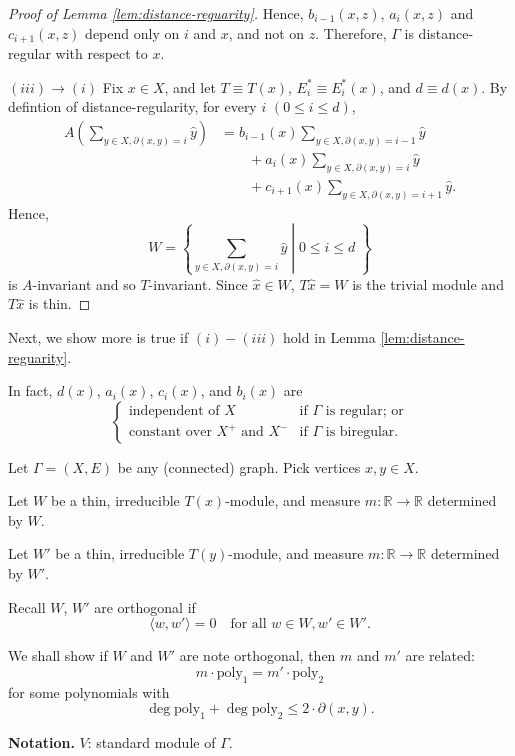\documentclass[
]{book}
\theoremstyle{definition}
\theoremstyle{definition}
\theoremstyle{definition}
\theoremstyle{definition}
\theoremstyle{remark}
\begin{document}
\begin{proof}[Proof of Lemma \ref{lem:distance-reguarity}]
Hence, \(b_{i-1}(x,z)\), \(a_i(x,z)\) and \(c_{i+1}(x,z)\) depend only on \(i\) and \(x\), and not on \(z\).
Therefore, \(\Gamma\) is distance-regular with respect to \(x\).

\((iii)\to (i)\)
Fix \(x\in X\), and let \(T \equiv T(x)\), \(E^*_i\equiv E^*_i(x)\), and \(d \equiv d(x)\).
By defintion of distance-regularity, for every \(i\) \((0\leq i\leq d)\),
\begin{align}
A\left(\sum_{y\in X, \partial(x,y)=i}\hat{y}\right) & = 
b_{i-1}(x)\sum_{y\in X, \partial(x,y) = i-1}\hat{y} \\
& \qquad + a_{i}(x)\sum_{y\in X, \partial(x,y) = i}\hat{y}\\
& \qquad + c_{i+1}(x)\sum_{y\in X, \partial(x,y) = i+1}\hat{y}.
\end{align}
Hence,
\[W = \left\{\left.\sum_{y\in X, \partial(x,y)=i}\hat{y} \; \right| \; 0\leq i\leq d\; \right\}\]
is \(A\)-invariant and so \(T\)-invariant. Since \(\hat{x}\in W\), \(T\hat{x} = W\) is the trivial module and \(T\hat{x}\) is thin.
\end{proof}

Next, we show more is true if \((i)-(iii)\) hold in Lemma \ref{lem:distance-reguarity}.

In fact, \(d(x)\), \(a_i(x)\), \(c_i(x)\), and \(b_i(x)\) are
\[\begin{cases} 
\text{independent of $X$} & \text{if $\Gamma$ is regular; or}\\
\text{constant over $X^+$ and $X^-$} & \text{if $\Gamma$ is biregular.}
\end{cases}\]

Let \(\Gamma = (X, E)\) be any (connected) graph. Pick vertices \(x, y\in X\).

Let \(W\) be a thin, irreducible \(T(x)\)-module, and
measure \(m: \mathbb{R} \to \mathbb{R}\) determined by \(W\).

Let \(W'\) be a thin, irreducible \(T(y)\)-module, and
measure \(m: \mathbb{R} \to \mathbb{R}\) determined by \(W'\).

Recall \(W\), \(W'\) are orthogonal if
\[\langle w, w'\rangle = 0 \quad \text{for all }w\in W, w'\in W'.\]

We shall show if \(W\) and \(W'\) are note orthogonal, then \(m\) and \(m'\) are related:
\[m\cdot \mathrm{poly}_1 = m'\cdot \mathrm{poly}_2\]
for some polynomials with
\[\deg \mathrm{poly}_1 + \deg \mathrm{poly}_2 \leq 2\cdot \partial(x,y).\]

\textbf{Notation.}
\(V\): standard module of \(\Gamma\).
\end{document}
